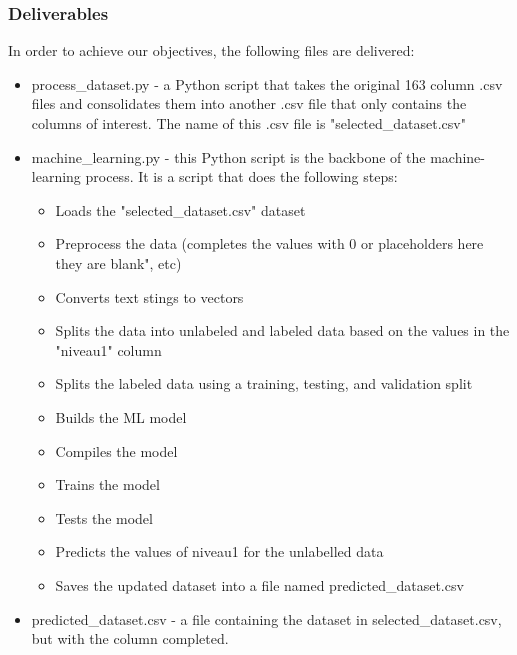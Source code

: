 \subsubsection{Deliverables}
In order to achieve our objectives, the following files are delivered: 
\begin{itemize}
    \item process\_dataset.py - a Python script that takes the original 163 column .csv files and consolidates them into another .csv file that only contains the columns of interest. The name of this .csv file is "selected\_dataset.csv" 
    \item machine\_learning.py - this Python script is the backbone of the machine-learning process. It is a script that does the following steps: 
        \begin{itemize}
            \item Loads the "selected\_dataset.csv" dataset
            \item Preprocess the data (completes the values with 0 or placeholders here they are blank", etc)
            \item Converts text stings to vectors
            \item Splits the data into unlabeled and labeled data based on the values in the "niveau1" column
            \item Splits the labeled data using a training, testing, and validation split
            \item Builds the ML model
            \item Compiles the model
            \item Trains the model
            \item Tests the model
            \item Predicts the values of niveau1 for the unlabelled data
            \item Saves the updated dataset into a file named predicted\_dataset.csv
        \end{itemize}
    \item predicted\_dataset.csv - a file containing the dataset in selected\_dataset.csv, but with the column completed. 
\end{itemize}
